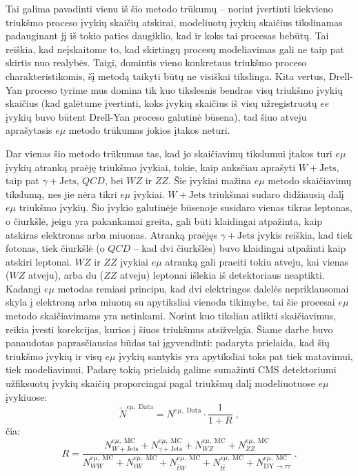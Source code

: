 \documentclass[a4paper, 12pt]{article}
\newcommand{\WW}{W\! W}
\newcommand{\ZZ}{Z\! Z}
\newcommand{\WZ}{W\! Z}
\newcommand{\gJets}{\gamma\! +\!\mathrm{Jets}}
\newcommand{\WJets}{W\! +\!\mathrm{Jets}}
\newcommand{\DYtau}{\mathrm{DY} \! \rightarrow \! \tau\tau}
\newcommand{\QCD}{QC\! D}
\newlength\q
\begin{document}
Tai galima pavadinti vienu iš šio metodo trūkumų -- norint įvertinti kiekvieno triukšmo proceso įvykių skaičių atskirai, modeliuotų įvykių skaičius tikslinamas padauginant jį iš tokio paties daugiklio, kad ir koks tai procesas bebūtų. Tai reiškia, kad neįskaitome to, kad skirtingų procesų modeliavimas gali ne taip pat skirtis nuo realybės. Taigi, domintis vieno konkretaus triukšmo proceso charakteristikomis, šį metodą taikyti būtų ne visiškai tikslinga. Kita vertus, Drell-Yan proceso tyrime mus domina tik kuo tikslesnis bendras visų triukšmo įvykių skaičius (kad galėtume įvertinti, koks įvykių skaičius iš visų užregistruotų $ee$ įvykių buvo būtent Drell-Yan proceso galutinė būsena), tad šiuo atveju aprašytasis $e\mu$ metodo trūkumas jokios įtakos neturi.

Dar vienas šio metodo trūkumas tas, kad jo skaičiavimų tikslumui įtakos turi $e\mu$ įvykių atranką praėję triukšmo įvykiai, tokie, kaip anksčiau aprašyti $\WJets$, taip pat $\gJets$, $\QCD$, bei $\WZ$ ir $\ZZ$. Šie įvykiai mažina $e\mu$ metodo skaičiavimų tikslumą, nes jie nėra tikri $e\mu$ įvykiai. $\WJets$ triukšmai sudaro didžiausią dalį $e\mu$ triukšmo įvykių. Šio įvykio galutinėje būsenoje susidaro vienas tikras leptonas, o čiurkšlė, jeigu yra pakankamai greita, gali būti klaidingai atpažinta, kaip atskiras elektronas arba miuonas. Atranką praėjęs $\gJets$ įvykis reiškia, kad tiek fotonas, tiek čiurkšlė (o $\QCD$ -- kad dvi čiurkšlės) buvo klaidingai atpažinti kaip atskiri leptonai. $\WZ$ ir $\ZZ$ įvykiai $e\mu$ atranką gali praeiti tokiu atveju, kai vienas ($\WZ$ atveju), arba du ($\ZZ$ atveju) leptonai išlekia iš detektoriaus neaptikti. Kadangi $e\mu$ metodas remiasi principu, kad dvi elektringos dalelės nepriklausomai skyla į elektroną arba miuoną su apytiksliai vienoda tikimybe, tai šie procesai $e\mu$ metodo skaičiavimams yra netinkami. Norint kuo tiksliau atlikti skaičiavimus, reikia įvesti korekcijas, kurios į šiuos triukšmus atsižvelgia. Šiame darbe buvo panaudotas paprasčiausias būdas tai įgyvendinti: padaryta prielaida, kad šių triukšmo įvykių ir visų $e\mu$ įvykių santykis yra apytiksliai toks pat tiek matavimui, tiek modeliavimui. Padarę tokią prielaidą galime sumažinti CMS detektoriumi užfiksuotų įvykių skaičių proporcingai pagal triukšmų dalį modeliuotuose $e\mu$ įvykiuose:
\begin{equation}
\label{eq:emu-Wjets_Short}
\widetilde{N}^{e\mu , \; \mathrm{Data}}=N^{e\mu , \; \mathrm{Data}}\cdot\frac{1}{1+R} \; \mathrm{,}
\end{equation}
čia:
\begin{equation}
R=\frac{N_{\WJets}^{e\mu , \; \mathrm{MC}}+N_{\gJets}^{e\mu , \; \mathrm{MC}}+
N_{\WZ}^{e\mu , \; \mathrm{MC}}+N_{\ZZ}^{e\mu , \; \mathrm{MC}}}
{N_{\WW}^{e\mu , \; \mathrm{MC}}+N_{tW}^{e\mu , \; \mathrm{MC}}+N_{\bar{t}W}^{e\mu , \; \mathrm{MC}}+N_{t\bar{t}}^{e\mu , \; \mathrm{MC}}
+N_{\DYtau}^{e\mu , \; \mathrm{MC}}} \; .
\label{eq:emuR}
\end{equation}
\end{document}
